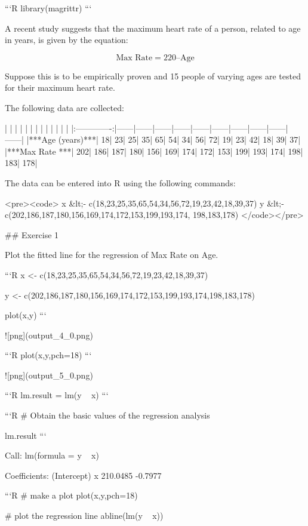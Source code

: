 

```R
library(magrittr)
```

A recent study suggests that the maximum heart rate of a person, related to age in
years, is given by the equation:

$$ \mbox{Max Rate} = 220 – \mbox{Age}$$

Suppose this is to be empirically proven and 15 people of varying ages are tested for
their maximum heart rate. 



The following data are collected:

| | | | | | | | | | | | |
|:-------------:|------|------|------|------|------|------|------|------|------|------|
|***Age (years)***| 18| 23| 25| 35| 65| 54| 34| 56| 72| 19| 23| 42| 18| 39| 37|
|***Max Rate ***| 202| 186| 187| 180| 156| 169| 174| 172| 153| 199| 193| 174| 198| 183| 178|

The data can be entered into R using the following commands:

<pre><code>
x &lt;- c(18,23,25,35,65,54,34,56,72,19,23,42,18,39,37)
y &lt;- c(202,186,187,180,156,169,174,172,153,199,193,174, 198,183,178)
</code></pre>

## Exercise 1

Plot the fitted line for the regression of Max Rate on Age. 



```R
x <- c(18,23,25,35,65,54,34,56,72,19,23,42,18,39,37)

y <- c(202,186,187,180,156,169,174,172,153,199,193,174,198,183,178)

plot(x,y)
```


![png](output_4_0.png)



```R
plot(x,y,pch=18)
```


![png](output_5_0.png)



```R
lm.result = lm(y ~ x)
```


```R
# Obtain the basic values of the regression analysis

lm.result
```


    
    Call:
    lm(formula = y ~ x)
    
    Coefficients:
    (Intercept)            x  
       210.0485      -0.7977  




```R
# make a plot
plot(x,y,pch=18)

# plot the regression line
abline(lm(y ~ x)) 


